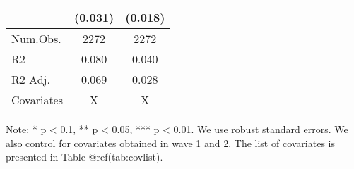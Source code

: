 \begin{table}
\begin{threeparttable}
\begin{tabular}[t]{lcc}
 & (\num{0.031}) & (\num{0.018})\\
\midrule
Num.Obs. & \num{2272} & \num{2272}\\
R2 & \num{0.080} & \num{0.040}\\
R2 Adj. & \num{0.069} & \num{0.028}\\
Covariates & X & X\\
\bottomrule
\end{tabular}
\begin{tablenotes}
\item Note: * p < 0.1, ** p < 0.05, *** p < 0.01. We use robust standard errors. We also control for covariates obtained in wave 1 and 2. The list of covariates is presented in Table @ref(tab:covlist).
\end{tablenotes}
\end{threeparttable}
\end{table}
